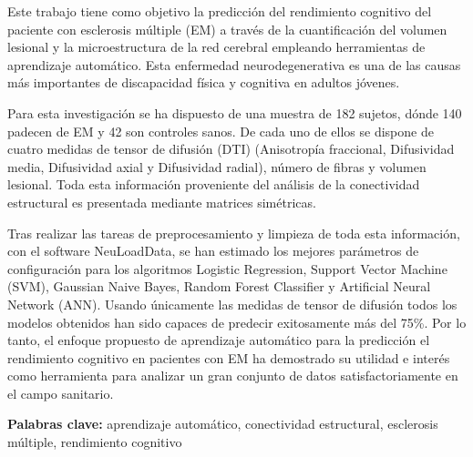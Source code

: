Este trabajo tiene como objetivo la predicción del rendimiento cognitivo del paciente con esclerosis múltiple (EM) a través de la cuantificación del volumen lesional y la microestructura de la red cerebral empleando herramientas de aprendizaje automático. Esta enfermedad neurodegenerativa es una de las causas más importantes de discapacidad física y cognitiva en adultos jóvenes.

Para esta investigación se ha dispuesto de una muestra de 182 sujetos, dónde 140 padecen de EM y 42 son controles sanos. De cada uno de ellos se dispone de cuatro medidas de tensor de difusión (DTI) (Anisotropía fraccional, Difusividad media, Difusividad axial y Difusividad radial), número de fibras y volumen lesional. Toda esta información proveniente del análisis de la conectividad estructural  es presentada mediante matrices simétricas.

Tras realizar las tareas de preprocesamiento y limpieza de toda esta información, con el software NeuLoadData, se han estimado los mejores parámetros de configuración para los algoritmos Logistic Regression, Support Vector Machine (SVM), Gaussian Naive Bayes, Random Forest Classifier y Artificial Neural Network (ANN). Usando únicamente las medidas de tensor de difusión todos los modelos obtenidos han sido capaces de predecir exitosamente más del 75\%. Por lo tanto, el enfoque propuesto de aprendizaje automático para la predicción el rendimiento cognitivo en pacientes con EM ha demostrado su utilidad e interés como herramienta para analizar un gran conjunto de datos satisfactoriamente en el campo sanitario.

\vspace*{1cm}

\textbf{Palabras clave:} aprendizaje automático, conectividad estructural, esclerosis múltiple, rendimiento cognitivo